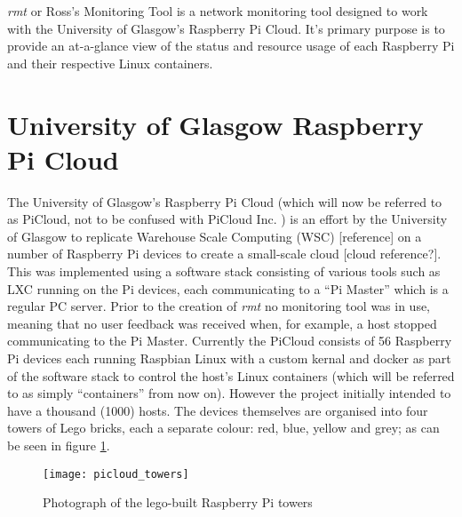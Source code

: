 \emph{rmt} or Ross's Monitoring Tool is a network monitoring tool 
designed to work with the University of Glasgow's Raspberry Pi 
Cloud. It's primary purpose is to provide an at-a-glance view of the 
status and resource usage of each Raspberry Pi and their respective 
Linux containers.

\section{University of Glasgow Raspberry Pi Cloud}
\label{intro:picloud}

The University of Glasgow's Raspberry Pi Cloud \citep{glapicloud, picloudblog} (which will now be 
referred to as PiCloud, not to be confused with PiCloud Inc. \citeyearpar{picloudinc}) is an effort by the University of Glasgow to replicate Warehouse Scale Computing (WSC) [reference] on a number of Raspberry Pi \citep{rasppi} devices to create a small-scale cloud [cloud reference?].
This was implemented using a software stack consisting of various tools such as LXC \citeyearpar{lxc} running on the Pi devices, each communicating to a ``Pi Master'' which is a regular PC server.
Prior to the creation of \emph{rmt} no monitoring tool was in use, meaning that no user feedback was received when, for example, a host stopped communicating to the Pi Master.
Currently the PiCloud consists of 56 Raspberry Pi devices each running Raspbian Linux \citeyearpar{raspbian} with a custom kernal and docker \citeyearpar{docker} as part of the software stack to control the host's Linux containers (which will be referred to as simply ``containers'' from now on).
However the project initially intended to have a thousand (1000) hosts.
The devices themselves are organised into four towers of Lego bricks, each a separate colour: red, blue, yellow and grey; as can be seen in figure \ref{fig:pitowers}.

\begin{figure}[t]
	\centering
	\texttt{[image: picloud\_towers]}
	\caption{Photograph of the lego-built Raspberry Pi towers}
	\label{fig:pitowers}
\end{figure}
